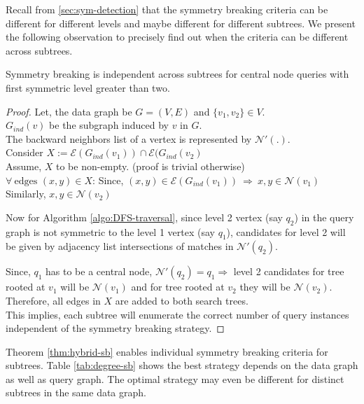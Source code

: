 Recall from \ref{sec:sym-detection} that the symmetry breaking criteria can be different for different levels and maybe different for different subtrees.
We present the following observation to precisely find out when the criteria can be different across subtrees.
\begin{theorem} \label{thm:hybrid-sb}
    Symmetry breaking is independent across subtrees for central node queries with first symmetric level greater than two.
\end{theorem}
\begin{proof}
    Let, the data graph be $G=(V, E)$ and $\{v_1, v_2\} \in V$.\\
    $G_{ind}(v)$ be the subgraph induced by $v$ in $G$.\\
    The backward neighbors list of a vertex is represented by $\mathcal{N}'(.)$.\\
    Consider $X:=\mathcal{E}(G_{ind}(v_1)) \cap \mathcal{E}(G_{ind}(v_2)$\\
    Assume, $X$ to be non-empty. (proof is trivial otherwise)\\
    $ \forall ~ \text{edges }(x,y) \in X$:
    Since, $(x,y) \in \mathcal{E}(G_{ind}(v_1)) ~ \Rightarrow ~ x,y \in \mathcal{N}(v_1)$\\
    Similarly,  $x,y \in \mathcal{N}(v_2)$

    Now for Algorithm \ref{algo:DFS-traversal}, since level 2 vertex (say $q_2$) in the query graph is not symmetric to the level 1 vertex (say $q_1$), candidates for level 2 will be given by adjacency list intersections of matches in $\mathcal{N'}(q_2)$.

    Since, $q_1$ has to be a central node, $\mathcal{N'}(q_2)=q_1 \Rightarrow $ level 2 candidates for tree rooted at $v_1$ will be $\mathcal{N}(v_1)$ and for tree rooted at $v_2$ they will be $\mathcal{N}(v_2).$
    Therefore, all edges in $X$ are added to both search trees.\\
    This implies, each subtree will enumerate the correct number of query instances independent of the symmetry breaking strategy.
\end{proof}

Theorem \ref{thm:hybrid-sb} enables individual symmetry breaking criteria for subtrees.
Table \ref{tab:degree-sb} shows the best strategy depends on the data graph as well as query graph.
The optimal strategy may even be different for distinct subtrees in the same data graph.

